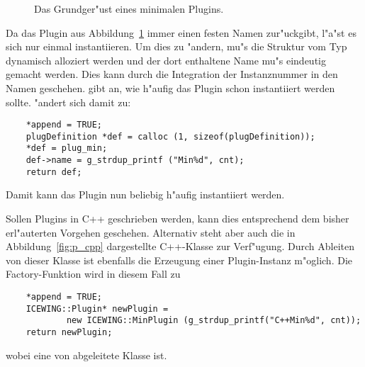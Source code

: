 \begin{figure}[htb]
  \begin{center}
    \begin{small}
    \end{small}
  \end{center}
  \caption[Ein minimales Plugin]
  {Das Grundger"ust eines minimalen Plugins.}
  \label{fig:p_min}
\end{figure}

Da das Plugin aus Abbildung~\ref{fig:p_min} immer einen festen
Namen zur"uckgibt, l"a"st es sich nur einmal instantiieren. Um dies
zu "andern, mu"s die Struktur vom Typ 
dynamisch alloziert werden und der dort enthaltene Name mu"s
eindeutig gemacht werden. Dies kann durch die Integration der
Instanznummer  in den Namen geschehen.  gibt an,
wie h"aufig das Plugin schon instantiiert werden
sollte.  "andert sich damit zu:
\begin{small}
\linespread{0.9}
\begin{verbatim}
    *append = TRUE;
    plugDefinition *def = calloc (1, sizeof(plugDefinition));
    *def = plug_min;
    def->name = g_strdup_printf ("Min%d", cnt);
    return def;
\end{verbatim}
\end{small}
Damit kann das Plugin nun beliebig h"aufig instantiiert werden.

Sollen Plugins in C++ geschrieben werden, kann dies entsprechend dem
bisher erl"auterten Vorgehen geschehen. Alternativ steht aber auch
die in Abbildung~\ref{fig:p_cpp} dargestellte C++-Klasse zur
Verf"ugung. Durch Ableiten von dieser Klasse ist ebenfalls die
Erzeugung einer Plugin-Instanz m"oglich. Die Factory-Funktion
 wird in diesem Fall zu
\begin{small}
\linespread{0.9}
\begin{verbatim}
    *append = TRUE;
    ICEWING::Plugin* newPlugin =
            new ICEWING::MinPlugin (g_strdup_printf("C++Min%d", cnt));
    return newPlugin;
\end{verbatim}
\end{small}
wobei  eine von 
abgeleitete Klasse ist.

